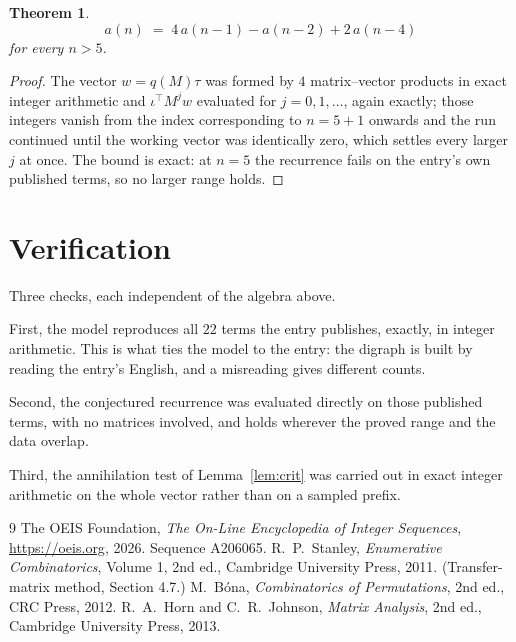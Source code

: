 \documentclass[11pt,a4paper]{article}
\theoremstyle{plain}
\newtheorem{theorem}{Theorem}
\theoremstyle{definition}
\begin{document}
\begin{theorem}
\[
a(n)\;=\;4\,a(n-1) - a(n-2) + 2\,a(n-4)
\]
for every $n>5$.
\end{theorem}

\begin{proof}
The vector $w=q(M)\tau$ was formed by $4$ matrix--vector products in exact integer
arithmetic and $\iota^{\!\top}M^{j}w$ evaluated for $j=0,1,\dots$, again exactly; those
integers vanish from the index corresponding to $n=5+1$ onwards and the run continued
until the working vector was identically zero, which settles every larger $j$ at once. The bound is exact: at $n=5$ the recurrence fails on the entry's own published terms, so no larger range holds.
\end{proof}

\section{Verification}

Three checks, each independent of the algebra above.

First, the model reproduces all $22$ terms the entry publishes, exactly, in integer
arithmetic. This is what ties the model to the entry: the digraph is built by reading the
entry's English, and a misreading gives different counts.

Second, the conjectured recurrence was evaluated directly on those published terms, with no
matrices involved, and holds wherever the proved range and the data overlap.

Third, the annihilation test of Lemma~\ref{lem:crit} was carried out in exact integer
arithmetic on the whole vector rather than on a sampled prefix.

\begin{thebibliography}{9}
 The OEIS Foundation, \emph{The On-Line Encyclopedia of Integer
Sequences}, \url{https://oeis.org}, 2026. Sequence A206065.
 R.~P.~Stanley, \emph{Enumerative Combinatorics}, Volume 1, 2nd ed.,
Cambridge University Press, 2011. (Transfer-matrix method, Section 4.7.)
 M.~B\'ona, \emph{Combinatorics of Permutations}, 2nd ed., CRC
Press, 2012.
 R.~A.~Horn and C.~R.~Johnson, \emph{Matrix Analysis}, 2nd ed., Cambridge
University Press, 2013.
\end{thebibliography}
\end{document}

